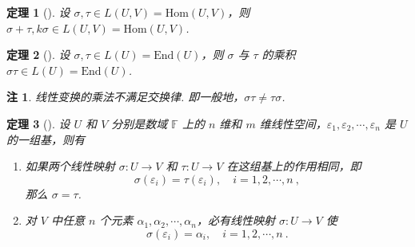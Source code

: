 \documentclass[zihao=-4,UTF8,linespread=1.8,nothm]{aytony_base}
\newtheorem{theorem}{\indent 定理}[subsection]
\newtheorem*{remark}{\indent 注}
\begin{document}
\begin{theorem}[]
    设 $\sigma, \tau \in L(U, V) = \mathrm{Hom}(U, V)$，则 $\sigma + \tau, k\sigma \in L(U, V) = \mathrm{Hom}(U, V)$.
\end{theorem}

\begin{theorem}[]
    设 $\sigma, \tau \in L(U) = \mathrm{End}(U)$，则 $\sigma$ 与 $\tau$ 的乘积 $\sigma\tau \in L(U) = \mathrm{End}(U)$.
\end{theorem}

\begin{remark}
    线性变换的乘法不满足交换律. 即一般地，$\sigma\tau \neq \tau\sigma$.
\end{remark}

\begin{theorem}[]
    设 $U$ 和 $V$ 分别是数域 $\mathbb{F}$ 上的 $n$ 维和 $m$ 维线性空间，$\varepsilon_1, \varepsilon_2, \cdots, \varepsilon_n$ 是 $U$ 的一组基，则有

    \begin{enumerate}[nosep]
        \item 如果两个线性映射 $\sigma: U \to V$ 和 $\tau: U \to V$ 在这组基上的作用相同，即 $$
                  \sigma(\varepsilon_i) = \tau(\varepsilon_i), \quad i = 1, 2, \cdots, n\ ,
              $$ 那么 $\sigma = \tau$.
        \item 对 $V$ 中任意 $n$ 个元素 $\alpha_1, \alpha_2, \cdots, \alpha_n$，必有线性映射 $\sigma: U \to V$ 使 $$
                  \sigma(\varepsilon_i) = \alpha_i, \quad i = 1, 2, \cdots, n\ .
              $$
    \end{enumerate}
\end{theorem}
\end{document}
